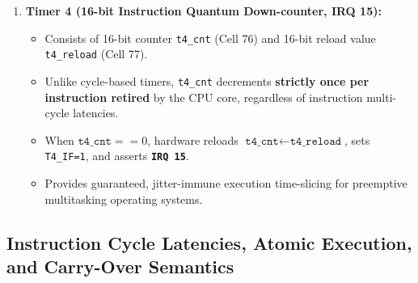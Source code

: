 \documentclass[11pt,a4paper]{article}
\begin{document}
\begin{archcallout}[title={Timer Subsystem Architectural Specifications}]
\begin{enumerate}
    \begin{itemize}
        \item Consists of 32-bit counter \texttt{t3\_cnt} (Cells 74, 75). Requires no dedicated reload register.
        \item The programmer writes the desired delay directly into \texttt{t3\_cnt} and asserts \texttt{T3\_EN=1}.
        \item Decrements on every cycle while \(\texttt{t3\_cnt} > 0\).
        \item Upon reaching 0, the hardware automatically halts counting by clearing \(\texttt{T3\_EN} \leftarrow 0\), sets \texttt{T3\_IF=1}, and asserts \textbf{\texttt{IRQ 14}}. The timer remains stopped until software rearms it.
    \end{itemize}
    \item \textbf{Timer 4 (16-bit Instruction Quantum Down-counter, IRQ 15):}
    \begin{itemize}
        \item Consists of 16-bit counter \texttt{t4\_cnt} (Cell 76) and 16-bit reload value \texttt{t4\_reload} (Cell 77).
        \item Unlike cycle-based timers, \texttt{t4\_cnt} decrements \textbf{strictly once per instruction retired} by the CPU core, regardless of instruction multi-cycle latencies.
        \item When \(\texttt{t4\_cnt} == 0\), hardware reloads \(\texttt{t4\_cnt} \leftarrow \texttt{t4\_reload}\), sets \texttt{T4\_IF=1}, and asserts \textbf{\texttt{IRQ 15}}.
        \item Provides guaranteed, jitter-immune execution time-slicing for preemptive multitasking operating systems.
    \end{itemize}
\end{enumerate}
\end{archcallout}

\subsection{Instruction Cycle Latencies, Atomic Execution, and Carry-Over Semantics}
\end{document}
